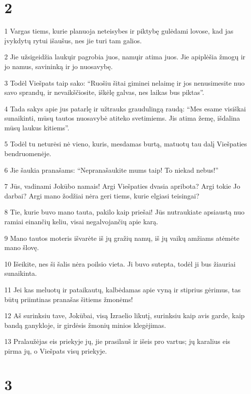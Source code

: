 \chapter{2}


\par 1 Vargas tiems, kurie planuoja neteisybes ir piktybę gulėdami lovose, kad jas įvykdytų rytui išaušus, nes jie turi tam galios. 
\par 2 Jie užsigeidžia laukų­ir pagrobia juos, namų­ir atima juos. Jie apiplėšia žmogų ir jo namus, savininką ir jo nuosavybę. 
\par 3 Todėl Viešpats taip sako: “Ruošiu šitai giminei nelaimę ir jos nenusimesite nuo savo sprandų, ir nevaikščiosite, iškėlę galvas, nes laikas bus piktas”. 
\par 4 Tada sakys apie jus patarlę ir užtrauks graudulingą raudą: “Mes esame visiškai sunaikinti, mūsų tautos nuosavybė atiteko svetimiems. Jis atima žemę, išdalina mūsų laukus kitiems”. 
\par 5 Todėl tu neturėsi nė vieno, kuris, mesdamas burtą, matuotų tau dalį Viešpaties bendruomenėje. 
\par 6 Jie šaukia pranašams: “Nepranašaukite mums taip! To niekad nebus!” 
\par 7 Jūs, vadinami Jokūbo namais! Argi Viešpaties dvasia apribota? Argi tokie Jo darbai? Argi mano žodžiai nėra geri tiems, kurie elgiasi teisingai? 
\par 8 Tie, kurie buvo mano tauta, pakilo kaip priešai! Jūs nutraukiate apsiaustą nuo ramiai einančių keliu, visai negalvojančių apie karą. 
\par 9 Mano tautos moteris išvarėte iš jų gražių namų, iš jų vaikų amžiams atėmėte mano šlovę. 
\par 10 Išeikite, nes ši šalis nėra poilsio vieta. Ji buvo sutepta, todėl ji bus žiauriai sunaikinta. 
\par 11 Jei kas meluotų ir pataikautų, kalbėdamas apie vyną ir stiprius gėrimus, tas būtų priimtinas pranašas šitiems žmonėms! 
\par 12 Aš surinksiu tave, Jokūbai, visą Izraelio likutį, surinksiu kaip avis garde, kaip bandą ganykloje, ir girdėsis žmonių minios klegėjimas. 
\par 13 Pralaužėjas eis priekyje jų, jie prasilauš ir išeis pro vartus; jų karalius eis pirma jų, o Viešpats visų priekyje.



\chapter{3}


